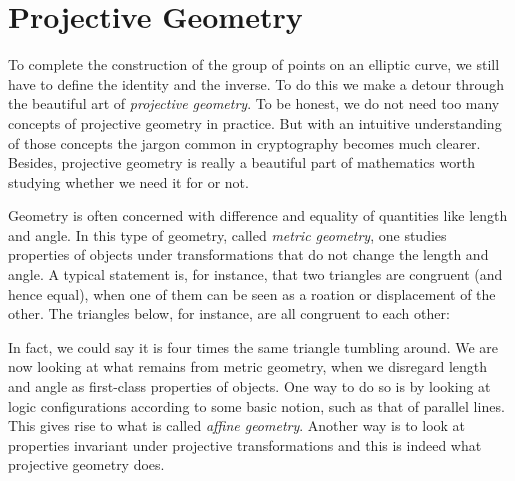 \documentclass[tikz]{scrreprt}
\newcommand{\Conid}[1]{\mathit{#1}}
\def\resethooks{%
  \global\let\SaveRestoreHook\empty
  \global\let\ColumnHook\empty}
\let\hspre\empty
\let\hspost\empty
\begin{document}
\section{Projective Geometry} 
\ignore{
\begingroup\par\noindent\advance\leftskip\mathindent\(
\begin{pboxed}\SaveRestoreHook
\column{B}{@{}>{\hspre}l<{\hspost}@{}}%
\column{E}{@{}>{\hspre}l<{\hspost}@{}}%
\>[B]{}\mathbf{module}\;\Conid{ECProjective}{}\<[E]%
\\
\>[B]{}\mathbf{where}{}\<[E]%
\ColumnHook
\end{pboxed}
\)\par\noindent\endgroup\resethooks
}

To complete the construction of the group 
of points on an elliptic curve, we still
have to define the identity and the inverse.
To do this we make a detour through the
beautiful art of \emph{projective geometry}.
To be honest, we do not need too many
concepts of projective geometry in practice.
But with an intuitive understanding of those concepts
the jargon common in  cryptography
becomes much clearer. Besides, projective geometry
is really a beautiful part of mathematics
worth studying whether we need it for 
or not.

Geometry is often concerned with difference and
equality of quantities like length and angle.
In this type of geometry, called \emph{metric geometry},
one studies properties of objects under transformations
that do not change the length and angle.
A typical statement is, for instance, that two triangles
are congruent (and hence equal), when one of them
can be seen as a roation or displacement of the other.
The triangles below,
for instance, are all congruent to each other:

\begin{center}
\end{center}

In fact, we could say it is four times
the same triangle tumbling around.
We are now looking at what remains 
from metric geometry, when we disregard
length and angle as first-class properties of objects.
One way to do so is by looking at logic configurations
according to some basic notion, such as that of parallel lines.
This gives rise to what is called \emph{affine geometry}.
Another way is to look at properties invariant under 
projective transformations and this is indeed
what projective geometry does.
\end{document}

